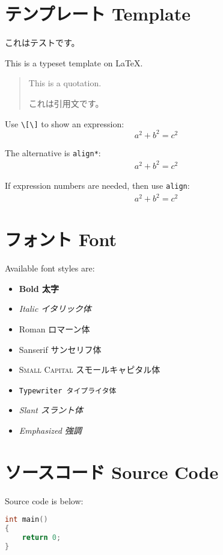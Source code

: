 




\section{テンプレート Template}

これはテストです。

This is a typeset template on \LaTeX.

\begin{quotation}
This is a quotation. 

これは引用文です。
\end{quotation}

Use \verb|\[\]| to show an expression:
\[a^2+b^2=c^2\]

The alternative is \verb|align*|:
\begin{align*}
a^2+b^2=c^2
\end{align*}

If expression numbers are needed, then use \verb|align|:
\begin{align}
a^2+b^2=c^2
\end{align}

\section{フォント Font}
Available font styles are:
\begin{itemize}
\item \textbf{Bold 太字}
\item \textit{Italic イタリック体}
\item \textrm{Roman ロマーン体}
\item \textsf{Sanserif サンセリフ体}
\item \textsc{Small Capital スモールキャピタル体}
\item \texttt{Typewriter タイプライタ体}
\item \textsl{Slant スラント体}
\item \emph{Emphasized 強調}
\end{itemize}

\section{ソースコード Source Code}
Source code is below:
\begin{lstlisting}[language=c]
int main()
{
    return 0;
}
\end{lstlisting}



